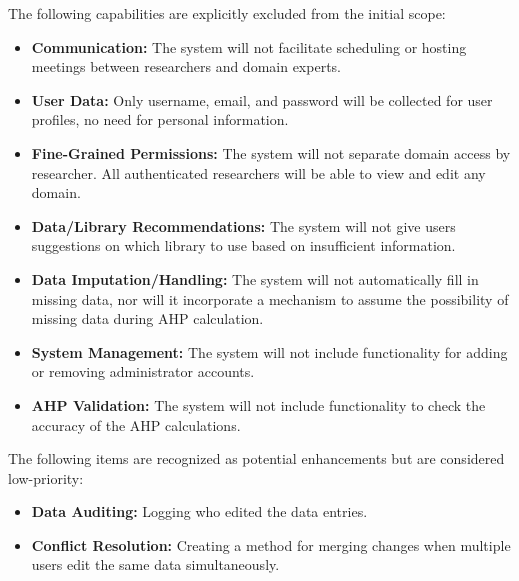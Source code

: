 \documentclass[12pt]{article}
\begin{document}
\noindent The following capabilities are explicitly excluded from the initial scope:

\begin{itemize}
  \item \textbf{Communication:} The system will not facilitate scheduling or hosting meetings between researchers and domain experts.
  \item \textbf{User Data:} Only username, email, and password will be collected for user profiles, no need for personal information.
  \item \textbf{Fine-Grained Permissions:} The system will not separate domain access by researcher. All authenticated researchers will be able to view and edit any domain.
  \item \textbf{Data/Library Recommendations:} The system will not give users suggestions on which library to use based on insufficient information.
  \item \textbf{Data Imputation/Handling:} The system will not automatically fill in missing data, nor will it incorporate a mechanism to assume the possibility of missing data during AHP calculation.
  \item \textbf{System Management:} The system will not include functionality for adding or removing administrator accounts.
  \item \textbf{AHP Validation:} The system will not include functionality to check the accuracy of the AHP calculations.
\end{itemize}

\noindent The following items are recognized as potential enhancements but are considered low-priority:

\begin{itemize}
  \item \textbf{Data Auditing:} Logging who edited the data entries.
  \item \textbf{Conflict Resolution:} Creating a method for merging changes when multiple users edit the same data simultaneously.
\end{itemize}
\end{document}
